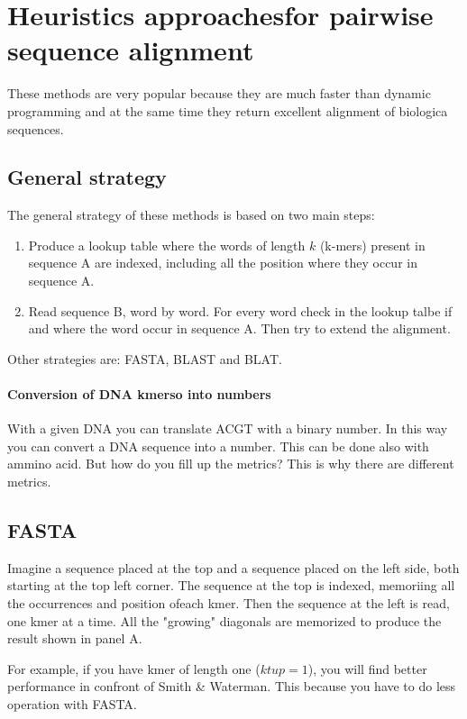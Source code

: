 \section{Heuristics approachesfor pairwise sequence alignment}
These methods are very popular because they are much faster than dynamic
programming and at the same time they return excellent alignment of biologica
sequences.

\subsection{General strategy}

The general strategy of these methods is based on two main steps:
\begin{enumerate}
  \item Produce a lookup table where the words of length $k$ (k-mers) present
in sequence A are indexed, including all the position where they occur in
sequence A.
  \item Read sequence B, word by word. For every word check in the lookup talbe
if and where the word occur in sequence A. Then try to extend the alignment.
\end{enumerate}

Other strategies are: FASTA, BLAST and BLAT.

\paragraph*{Conversion of DNA kmerso into numbers}

With a given DNA you can translate ACGT with a binary number. In this way you
can convert a DNA sequence into a number. This can be done also with ammino
acid.
But how do you fill up the metrics? This is why there are different metrics.

\subsection{FASTA}

Imagine a sequence placed at the top and a sequence placed on the left side,
both starting at the top left corner. The sequence at the top is indexed,
memoriing all the occurrences and position ofeach kmer. Then the sequence at
the left is read, one kmer at a time. All the "growing" diagonals are memorized
to produce the result shown in panel A.

For example, if you have kmer of length one ($ktup = 1$), you will find better
performance in confront of Smith \& Waterman. This because you have to do less
operation with FASTA.

